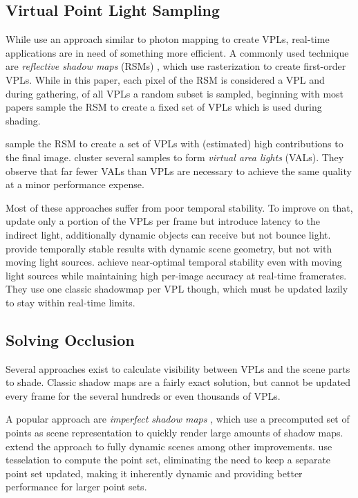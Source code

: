 \subsection{Virtual Point Light Sampling}

While \citet{Keller:1997:InstantRadiosity} use an approach similar to photon mapping to create VPLs, real-time applications are in need of something more efficient. A commonly used technique are \emph{reflective shadow maps} (RSMs) \citep{Dachsbacher:2005:RSM}, which use rasterization to create first-order VPLs. While in this paper, each pixel of the RSM is considered a VPL and during gathering, of all VPLs a random subset is sampled, beginning with \citet{dachsbacher2006splatting} most papers sample the RSM to create a fixed set of VPLs which is used during shading.

\citet{georgiev2010simple, ritschel2011ismsViewAdaptive} sample the RSM to create a set of VPLs with (estimated) high contributions to the final image. \citet{dong2009real, prutkin2012reflective} cluster several samples to form \emph{virtual area lights} (VALs). They observe that far fewer VALs than VPLs are necessary to achieve the same quality at a minor performance expense.

Most of these approaches suffer from poor temporal stability. To improve on that, \citet{laine2007incremental} update only a portion of the VPLs per frame but introduce latency to the indirect light, additionally dynamic objects can receive but not bounce light. \citet{barak2013temporally} provide temporally stable results with dynamic scene geometry, but not with moving light sources. \citet{hedman2016sequential} achieve near-optimal temporal stability even with moving light sources while maintaining high per-image accuracy at real-time framerates. They use one classic shadowmap per VPL though, which must be updated lazily to stay within real-time limits.


\subsection{Solving Occlusion}

Several approaches exist to calculate visibility between VPLs and the scene parts to shade. Classic shadow maps are a fairly exact solution, but cannot be updated every frame for the several hundreds or even thousands of VPLs.

A popular approach are \emph{imperfect shadow maps} \citep[ISMs,][]{ritschel2008ism}, which use a precomputed set of points as scene representation to quickly render large amounts of shadow maps. \citet{ritschel2011ismsViewAdaptive} extend the approach to fully dynamic scenes among other improvements. \citet{barak2013temporally} use tesselation to compute the point set, eliminating the need to keep a separate point set updated, making it inherently dynamic and providing better performance for larger point sets.

